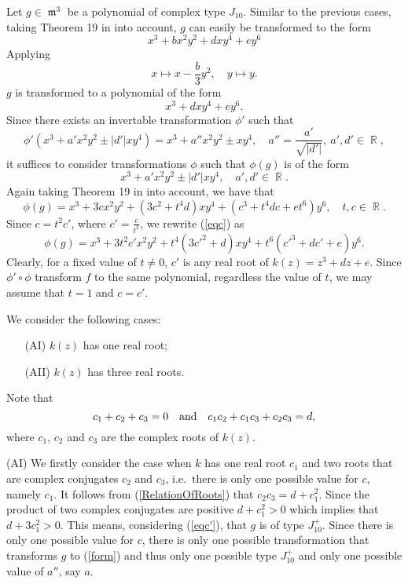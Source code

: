 \documentclass[noend]{amsproc}
\theoremstyle{definition}
\DeclareMathOperator{\m}{\mathfrak{m}}
\DeclareMathOperator{\R}{\mathbb{R}}
\begin{document}
Let $g\in\m^3$ be a polynomial of complex type $J_{10}$. Similar to the previous cases, taking Theorem 19 in \cite{realclassify2} into account, $g$ can easily be transformed to the form
\[x^3+bx^2y^2+dxy^4+ey^6\] Applying
\begin{equation}\label{Cancelling2ndTerm}
x\mapsto x-\frac{b}{3}y^2,\quad y\mapsto y.
\end{equation}
$g$ is transformed to a polynomial of the form
\[x^3+dxy^4+ey^6.\] Since there exists an
invertable transformation $\phi'$ such that
\begin{equation}\label{phi'}
\phi'(x^3+a'x^2y^2\pm |d'|xy^4)=x^3+a''x^2y^2\pm xy^4,\quad
a''=\frac{a'}{\sqrt{|d'|}},\ a',d'\in \R,
\end{equation}
it suffices to consider transformations $\phi$ such that $\phi(g)$ is of the
form
\begin{equation}\label{form}
x^3+a'x^2y^2\pm |d'|xy^4,\quad a',d'\in \R.
\end{equation}
Again taking Theorem 19 in \cite{realclassify2}  into account, we have that
\begin{equation}\label{eqc}
\phi(g)=x^3+3cx^2y^2+(3c^2+t^4d)xy^4+(c^3+t^4dc+et^6)y^6,\quad t,c\in\R.
\end{equation}
Since $c=t^2c'$, where $c'=\frac{c}{t^2}$, we rewrite (\ref{eqc}) as
\begin{equation}\label{eqc'}
\phi(g)=x^3+3t^2c'x^2y^2+t^4(3c'^2+d)xy^4+t^6(c'^3+dc'+e)y^6.
\end{equation}
Clearly, for a fixed value of $t\neq 0$, $c'$ is any real root of
$k(z)=z^3+dz+e$. Since $\phi'\circ\phi$ transform $f$ to the same polynomial,
regardless the value of $t$, we may assume that $t=1$ and $c=c'$.

We consider the following cases:
\begin{itemize}
\item[(AI)]$k(z)$ has one real root;
\item[(AII)]$k(z)$ has three real roots.
\end{itemize}

Note that
\begin{equation}\label{RelationOfRoots}
c_1+c_2+c_3=0\quad\textnormal{and}\quad c_1c_2+c_1c_3+c_2c_3=d,
\end{equation}
where $c_1$, $c_2$ and $c_3$ are the complex roots of $k(z)$.

(AI) We firstly consider the case when $k$ has one real root $c_1$ and two
roots that are complex conjugates $c_2$ and $c_3$, i.e.~there is only one
possible value for $c$, namely $c_1$. It follows from (\ref{RelationOfRoots})
that $c_2c_3=d+c_1^2$. Since the product of two complex conjugates are positive
$d+c_1^2>0$ which implies that $d+3c_1^2>0$. This means, considering
(\ref{eqc'}), that $g$ is of type $J_{10}^+$. Since there is only one possible
value for $c$, there is only one possible transformation that transforms $g$ to
(\ref{form}) and thus only one possible type $J_{10}^+$ and only one possible
value of $a''$, say $a$.  
\end{document}
